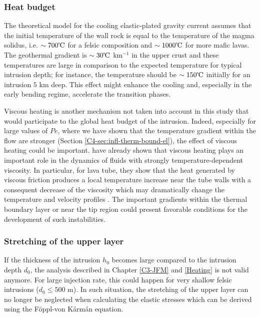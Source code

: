 \subsubsection*{Heat budget}
\label{subsubsection}

The theoretical  model for the cooling  elastic-plated gravity current
assumes that the initial temperature of  the wall rock is equal to the
temperature of  the magma solidus,  i.e. $\sim 700 \celsius$  for a
felsic composition and  $\sim 1000 \celsius$ for  more mafic lavas.
The geothermal gradient  is $\sim 30 \celsius$ km$^{-1}$  in the upper
crust and these  temperatures are large in comparison  to the expected
temperature for typical intrusion depth; for instance, the temperature
should be $\sim 150 \celsius$ initially  for an intrusion $5$ km deep.
This effect  might enhance  the cooling and,  especially in  the early
bending regime, accelerate the transition phases.

Viscous heating is another mechanism not taken into account in this
study  that  would  participate  to  the global  heat  budget  of  the
intrusion. Indeed, especially for large  values of $Pe$, where we have
shown  that the  temperature  gradient within  the  flow are  stronger
(Section  \ref{C4-sec:infl-therm-bound-el}),  the  effect  of  viscous
heating could  be important.  \citet{Costa:2005bq} have  already shown
that viscous heating plays an important role in the dynamics of fluids
with strongly temperature-dependent viscosity. In particular, for lava
tube, they show that the heat generated by viscous friction produces a
local  temperature increase  near  the tube  walls  with a  consequent
decrease  of   the  viscosity   which  may  dramatically   change  the
temperature             and              velocity             profiles
\citep{Costa:2002cj,Costa:2003wk,Costa:2005bq}.      The     important
gradients within  the thermal  boundary layer or  near the  tip region
could  present  favorable  conditions  for  the  development  of  such
instabilities. 

\subsubsection*{Stretching of the upper layer}
\label{subsubsection}

If the thickness of the intrusion  $h_0$ becomes large compared to the
intrusion depth $d_0$, the  analysis described in Chapter \ref{C3-JFM}
and \ref{Heating} is not valid anymore. For large injection rate, this
could happen for very shallow  felsic intrusions ($d_0\le 500$ m).  In
such situation,  the stretching of  the upper  layer can no  longer be
neglected when calculating  the elastic stresses which  can be derived
using the Föppl-von Kármán equation. 

